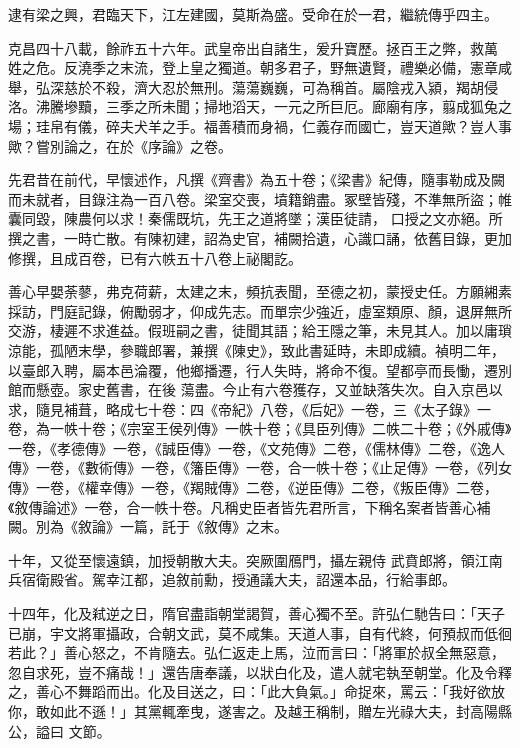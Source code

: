 \begin{pinyinscope}
 逮有梁之興，君臨天下，江左建國，莫斯為盛。受命在於一君，繼統傳乎四主。



 克昌四十八載，餘祚五十六年。武皇帝出自諸生，爰升寶歷。拯百王之弊，救萬
 姓之危。反澆季之末流，登上皇之獨道。朝多君子，野無遺賢，禮樂必備，憲章咸舉，弘深慈於不殺，濟大忍於無刑。蕩蕩巍巍，可為稱首。屬陰戎入潁，羯胡侵洛。沸騰墋黷，三季之所未聞；掃地滔天，一元之所巨厄。廊廟有序，翦成狐兔之場；珪帛有儀，碎夫犬羊之手。福善積而身禍，仁義存而國亡，豈天道歟？豈人事歟？嘗別論之，在於《序論》之卷。



 先君昔在前代，早懷述作，凡撰《齊書》為五十卷；《梁書》紀傳，隨事勒成及闕而未就者，目錄注為一百八卷。梁室交喪，墳籍銷盡。冢壁皆殘，不準無所盜；帷囊同毀，陳農何以求！秦儒既坑，先王之道將墜；漢臣徒請，
 口授之文亦絕。所撰之書，一時亡散。有陳初建，詔為史官，補闕拾遺，心識口誦，依舊目錄，更加修撰，且成百卷，已有六帙五十八卷上祕閣訖。



 善心早嬰荼蓼，弗克荷薪，太建之末，頻抗表聞，至德之初，蒙授史任。方願緗素採訪，門庭記錄，俯勵弱才，仰成先志。而單宗少強近，虛室類原、顏，退屏無所交游，棲遲不求進益。假班嗣之書，徒聞其語；給王隱之筆，未見其人。加以庸瑣涼能，孤陋末學，參職郎署，兼撰《陳史》，致此書延時，未即成續。禎明二年，以臺郎入聘，屬本邑淪覆，他鄉播遷，行人失時，將命不復。望都亭而長慟，遷別館而懸壺。家史舊書，在後
 蕩盡。今止有六卷獲存，又並缺落失次。自入京邑以求，隨見補葺，略成七十卷：四《帝紀》八卷，《后妃》一卷，三《太子錄》一卷，為一帙十卷；《宗室王侯列傳》一帙十卷；《具臣列傳》二帙二十卷；《外戚傳》一卷，《孝德傳》一卷，《誠臣傳》一卷，《文苑傳》二卷，《儒林傳》二卷，《逸人傳》一卷，《數術傳》一卷，《籓臣傳》一卷，合一帙十卷；《止足傳》一卷，《列女傳》一卷，《權幸傳》一卷，《羯賊傳》二卷，《逆臣傳》二卷，《叛臣傳》二卷，《敘傳論述》一卷，合一帙十卷。凡稱史臣者皆先君所言，下稱名案者皆善心補闕。別為《敘論》一篇，託于《敘傳》之末。



 十年，又從至懷遠鎮，加授朝散大夫。突厥圍鴈門，攝左親侍
 武賁郎將，領江南兵宿衛殿省。駕幸江都，追敘前勳，授通議大夫，詔還本品，行給事郎。



 十四年，化及弒逆之日，隋官盡詣朝堂謁賀，善心獨不至。許弘仁馳告曰：「天子已崩，宇文將軍攝政，合朝文武，莫不咸集。天道人事，自有代終，何預叔而低徊若此？」善心怒之，不肯隨去。弘仁返走上馬，泣而言曰：「將軍於叔全無惡意，忽自求死，豈不痛哉！」還告唐奉議，以狀白化及，遣人就宅執至朝堂。化及令釋之，善心不舞蹈而出。化及目送之，曰：「此大負氣。」命捉來，罵云：「我好欲放你，敢如此不遜！」其黨輒牽曳，遂害之。及越王稱制，贈左光祿大夫，封高陽縣公，謚曰
 文節。




\end{pinyinscope}
